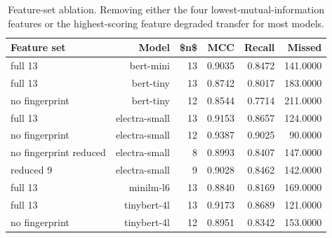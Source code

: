 \begin{table}[htbp]
\centering
\caption{Feature-set ablation. Removing either the four lowest-mutual-information features or the highest-scoring feature degraded transfer for most models.}
\label{tab:feature-ablation}
\small
\begin{tabular}{lrrrrr}
\toprule
Feature set & Model & \$n\$ & MCC & Recall & Missed \\
\midrule
full 13 & bert-mini & 13 & 0.9035 & 0.8472 & 141.0000 \\
full 13 & bert-tiny & 13 & 0.8742 & 0.8017 & 183.0000 \\
no fingerprint & bert-tiny & 12 & 0.8544 & 0.7714 & 211.0000 \\
full 13 & electra-small & 13 & 0.9153 & 0.8657 & 124.0000 \\
no fingerprint & electra-small & 12 & 0.9387 & 0.9025 & 90.0000 \\
no fingerprint reduced & electra-small & 8 & 0.8993 & 0.8407 & 147.0000 \\
reduced 9 & electra-small & 9 & 0.9028 & 0.8462 & 142.0000 \\
full 13 & minilm-l6 & 13 & 0.8840 & 0.8169 & 169.0000 \\
full 13 & tinybert-4l & 13 & 0.9173 & 0.8689 & 121.0000 \\
no fingerprint & tinybert-4l & 12 & 0.8951 & 0.8342 & 153.0000 \\
\bottomrule
\end{tabular}
\end{table}
